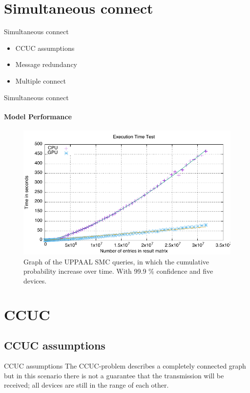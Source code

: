 \section{Simultaneous connect}
\begin{frame}{Simultaneous connect}
  \begin{itemize}
    \item CCUC assumptions
    \item Message redundancy
    \item Multiple connect
  \end{itemize}
\end{frame}

\begin{frame}{Simultaneous connect}
\framesubtitle{Model Performance}
  \begin{figure}[ht]
  \includegraphics[width=1\textwidth]{images/graph.pdf} 
\caption{Graph of the UPPAAL SMC queries, in which the cumulative probability increase over time. With 99.9 \% confidence and five devices.}
\label{fig:ConnectQueryTime}
\end{figure}
\end{frame}

\section{CCUC}
\subsection{CCUC assumptions}
\begin{frame}{CCUC assumptions}
The CCUC-problem describes a completely connected graph but in this scenario there is not a guarantee that the transmission will be received; all devices are still in the range of each other.
\end{frame}

